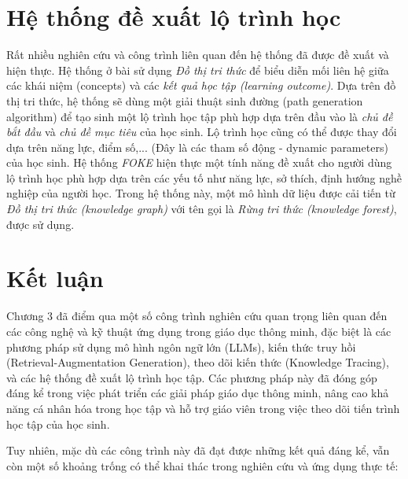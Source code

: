 \section{Hệ thống đề xuất lộ trình học}
Rất nhiều nghiên cứu và công trình liên quan đến hệ thống đã được đề xuất và hiện thực. Hệ thống ở bài \cite{Raj2022} sử dụng \emph{Đồ thị tri thức} để biểu diễn mối liên hệ giữa các khái niệm (concepts) và các \emph{kết quả học tập (learning outcome)}. Dựa trên đồ thị tri thức, hệ thống sẽ dùng một giải thuật sinh đường (path generation algorithm) để tạo sinh một lộ trình học tập phù hợp dựa trên đầu vào là \emph{chủ đề bắt đầu} và \emph{chủ đề mục tiêu} của học sinh. Lộ trình học cũng có thể được thay đổi dựa trên năng lực, điểm số,... (Đây là các tham số động - dynamic parameters) của học sinh. Hệ thống \emph{FOKE}\cite{hu2024fokepersonalizedexplainableeducation} hiện thực một tính năng đề xuất cho người dùng lộ trình học phù hợp dựa trên các yếu tố như năng lực, sở thích, định hướng nghề nghiệp của người học. Trong hệ thống này, một mô hình dữ liệu được cải tiến từ \emph{Đồ thị tri thức (knowledge graph)} với tên gọi là \emph{Rừng tri thức (knowledge forest)}, được sử dụng.
\section{Kết luận}

\par Chương 3 đã điểm qua một số công trình nghiên cứu quan trọng liên quan đến các công nghệ và kỹ thuật ứng dụng trong giáo dục thông minh, đặc biệt là các phương pháp sử dụng mô hình ngôn ngữ lớn (LLMs), kiến thức truy hồi (Retrieval-Augmentation Generation), theo dõi kiến thức (Knowledge Tracing), và các hệ thống đề xuất lộ trình học tập. Các phương pháp này đã đóng góp đáng kể trong việc phát triển các giải pháp giáo dục thông minh, nâng cao khả năng cá nhân hóa trong học tập và hỗ trợ giáo viên trong việc theo dõi tiến trình học tập của học sinh.

\par Tuy nhiên, mặc dù các công trình này đã đạt được những kết quả đáng kể, vẫn còn một số khoảng trống có thể khai thác trong nghiên cứu và ứng dụng thực tế:

